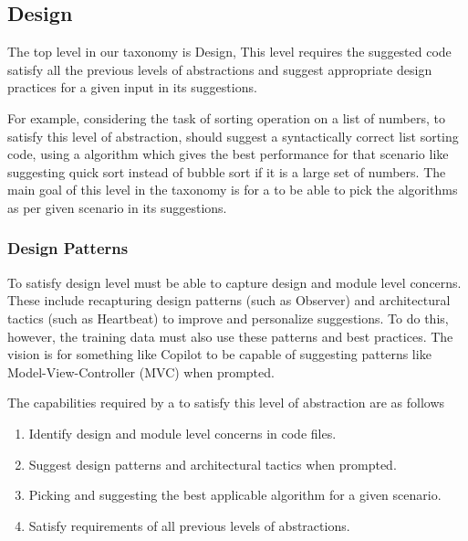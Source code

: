 \subsection{Design}
\label{design}
The top level in our taxonomy is Design, This level requires the suggested code satisfy all the previous levels of abstractions and suggest appropriate design practices for a given input in its suggestions.

For example, considering the task of sorting operation on a list of numbers, to satisfy this level of abstraction, \cct should suggest a syntactically correct list sorting code, using a algorithm which gives the best performance for that scenario like suggesting quick sort instead of bubble sort if it is a large set of numbers. The main goal of this level in the taxonomy is for a \cct{} to be able to pick the algorithms as per given scenario in its suggestions.

\subsubsection{Design Patterns}
\label{patterns}
To satisfy design level \cct{} must be able to capture design and module level concerns. 
These include recapturing design patterns (such as Observer) and architectural tactics (such as Heartbeat) to improve and personalize suggestions. 
To do this, however, the training data must also use these patterns and best practices.
The vision is for something like Copilot to be capable of suggesting patterns like Model-View-Controller (MVC) when prompted. 

The capabilities required by a \cct{} to satisfy this level of abstraction are as follows
\begin{enumerate}
    \item Identify design and module level concerns in code files.
    \item Suggest design patterns and architectural tactics when prompted.
    \item Picking and suggesting the best applicable algorithm for a given scenario.
    \item Satisfy requirements of all previous levels of abstractions.
\end{enumerate}

